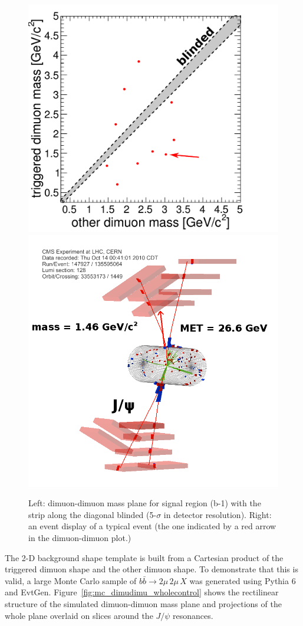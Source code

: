 \documentclass[12pt]{cms-tdr}
\begin{document}
\begin{figure}
\begin{center}
\includegraphics[height=7 cm]{PLOTS/data_dimudimu_wholecontrol.pdf} \hspace{0.5 cm}
\includegraphics[height=7 cm]{PLOTS/dimudimu_control_eventdisplay.png}
\end{center}

\caption{Left: dimuon-dimuon mass plane for signal region (b-1) with
  the strip along the diagonal blinded (5-$\sigma$ in detector
  resolution).  Right: an event display of a typical event (the one
  indicated by a red arrow in the dimuon-dimuon
  plot.) \label{fig:dimudimu_wholecontrol}}
\end{figure}

The 2-D background shape template is built from a Cartesian product of
the triggered dimuon shape and the other dimuon shape.  To demonstrate
that this is valid, a large Monte Carlo sample of $b\bar{b} \to 2\mu
\, 2\mu \, X$ was generated using Pythia 6 and EvtGen.
Figure~\ref{fig:mc_dimudimu_wholecontrol} shows the rectilinear
structure of the simulated dimuon-dimuon mass plane and projections of
the whole plane overlaid on slices around the $J/\psi$ resonances.
\end{document}
